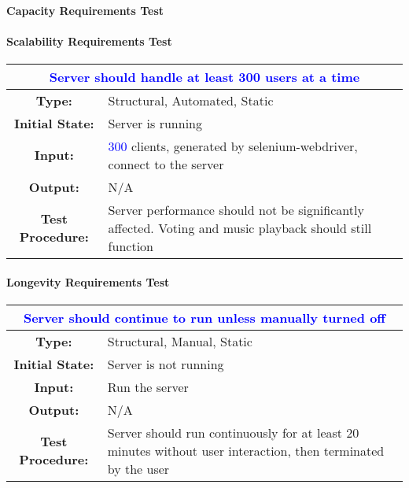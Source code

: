 \documentclass[12pt, titlepage]{article}
\newcommand{\numberOfStressTestClients}{\textcolor{blue}{300 }}
\begin{document}
\paragraph{Capacity Requirements Test}

\paragraph{Scalability Requirements Test}

\begin{center}
\begin{table}[H]
\begin{tabularx}{\textwidth}{| c X |}
\hline
\multicolumn{2}{|c|}{\textbf{\textcolor{blue}{Server should handle at least \numberOfStressTestClients users at a time}}}\\
\hline
\textbf{Type: } & Structural, Automated, Static\\
\textbf{Initial State: } & Server is running\\
\textbf{Input: } & \numberOfStressTestClients clients, generated by selenium-webdriver, connect to the server\\
\textbf{Output: } & N/A \\
\textbf{Test Procedure:  } & Server performance should not be significantly affected. Voting and music playback should still function \\
\hline
\end{tabularx}
\end{table}
\end{center}

\paragraph{Longevity Requirements Test}

\begin{center}
\begin{table}[H]
\begin{tabularx}{\textwidth}{| c X |}
\hline
\multicolumn{2}{|c|}{\textbf{\textcolor{blue}{Server should continue to run unless manually turned off}}}\\
\hline
\textbf{Type: } & Structural, Manual, Static\\
\textbf{Initial State: } & Server is not running\\
\textbf{Input: } & Run the server\\
\textbf{Output: } & N/A \\
\textbf{Test Procedure:  } & Server should run continuously for at least 20 minutes without user interaction, then terminated by the user \\
\hline
\end{tabularx}
\end{table}
\end{center}
\end{document}
